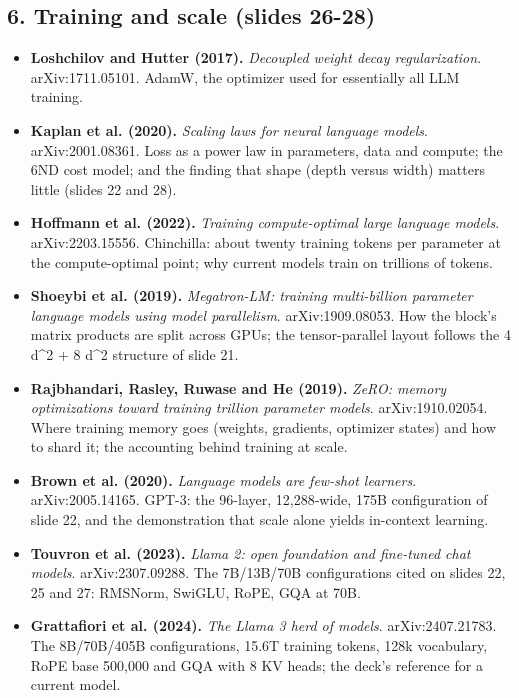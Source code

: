 \documentclass[11pt,letterpaper]{article}
\begin{document}
\subsection*{6. Training and scale (slides 26-28)}
\begin{itemize}[leftmargin=1.2em,itemsep=3pt]\sloppy
\item \textbf{Loshchilov and Hutter (2017).} \textit{Decoupled weight decay regularization}. arXiv:1711.05101. AdamW, the optimizer used for essentially all LLM training.
\item \textbf{Kaplan et al. (2020).} \textit{Scaling laws for neural language models}. arXiv:2001.08361. Loss as a power law in parameters, data and compute; the 6ND cost model; and the finding that shape (depth versus width) matters little (slides 22 and 28).
\item \textbf{Hoffmann et al. (2022).} \textit{Training compute-optimal large language models}. arXiv:2203.15556. Chinchilla: about twenty training tokens per parameter at the compute-optimal point; why current models train on trillions of tokens.
\item \textbf{Shoeybi et al. (2019).} \textit{Megatron-LM: training multi-billion parameter language models using model parallelism}. arXiv:1909.08053. How the block's matrix products are split across GPUs; the tensor-parallel layout follows the 4 d\^{}2 + 8 d\^{}2 structure of slide 21.
\item \textbf{Rajbhandari, Rasley, Ruwase and He (2019).} \textit{ZeRO: memory optimizations toward training trillion parameter models}. arXiv:1910.02054. Where training memory goes (weights, gradients, optimizer states) and how to shard it; the accounting behind training at scale.
\item \textbf{Brown et al. (2020).} \textit{Language models are few-shot learners}. arXiv:2005.14165. GPT-3: the 96-layer, 12,288-wide, 175B configuration of slide 22, and the demonstration that scale alone yields in-context learning.
\item \textbf{Touvron et al. (2023).} \textit{Llama 2: open foundation and fine-tuned chat models}. arXiv:2307.09288. The 7B/13B/70B configurations cited on slides 22, 25 and 27: RMSNorm, SwiGLU, RoPE, GQA at 70B.
\item \textbf{Grattafiori et al. (2024).} \textit{The Llama 3 herd of models}. arXiv:2407.21783. The 8B/70B/405B configurations, 15.6T training tokens, 128k vocabulary, RoPE base 500,000 and GQA with 8 KV heads; the deck's reference for a current model.
\end{itemize}
\end{document}

